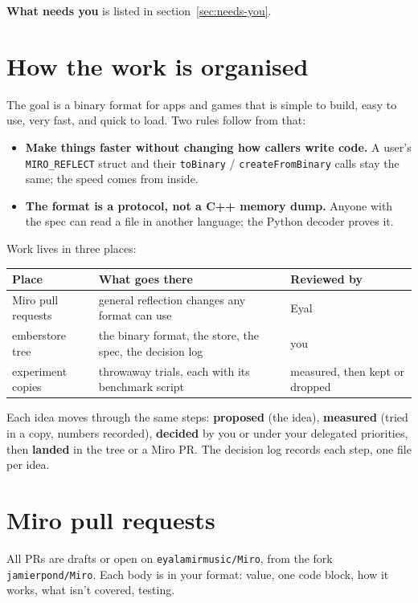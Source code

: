 \documentclass[11pt,a4paper]{article}
\newcommand{\code}[1]{\texttt{#1}}
\begin{document}
\textbf{What needs you} is listed in section~\ref{sec:needs-you}.

\section{How the work is organised}

The goal is a binary format for apps and games that is simple to build, easy to use, very fast, and quick to load. Two rules follow from that:
\begin{itemize}
  \item \textbf{Make things faster without changing how callers write code.} A user's \code{MIRO\_REFLECT} struct and their \code{toBinary} / \code{createFromBinary} calls stay the same; the speed comes from inside.
  \item \textbf{The format is a protocol, not a C++ memory dump.} Anyone with the spec can read a file in another language; the Python decoder proves it.
\end{itemize}

Work lives in three places:

\begin{tabularx}{\textwidth}{@{}l X l@{}}
\toprule
Place & What goes there & Reviewed by \\
\midrule
Miro pull requests & general reflection changes any format can use & Eyal \\
emberstore tree & the binary format, the store, the spec, the decision log & you \\
experiment copies & throwaway trials, each with its benchmark script & measured, then kept or dropped \\
\bottomrule
\end{tabularx}

Each idea moves through the same steps: \textbf{proposed} (the idea), \textbf{measured} (tried in a copy, numbers recorded), \textbf{decided} by you or under your delegated priorities, then \textbf{landed} in the tree or a Miro PR. The decision log records each step, one file per idea.

\section{Miro pull requests}

All PRs are drafts or open on \code{eyalamirmusic/Miro}, from the fork \code{jamierpond/Miro}. Each body is in your format: value, one code block, how it works, what isn't covered, testing.
\end{document}
